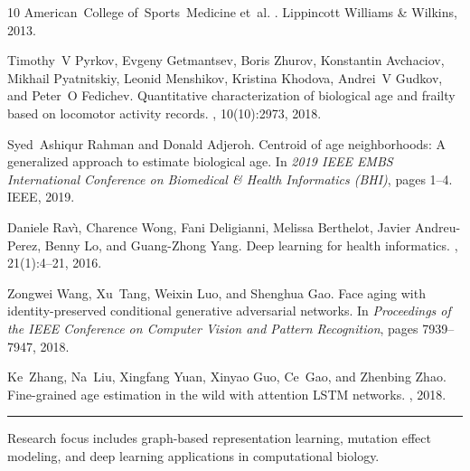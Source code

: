 \documentclass[unnumsec,webpdf,contemporary,large]{oup-authoring-template}%
\theoremstyle{thmstyleone}%
\theoremstyle{thmstyletwo}%
\theoremstyle{thmstylethree}%
\begin{document}
\begin{thebibliography}{10}
American~College of~Sports~Medicine et~al.
.
\newblock Lippincott Williams \& Wilkins, 2013.

Timothy~V Pyrkov, Evgeny Getmantsev, Boris Zhurov, Konstantin Avchaciov, Mikhail Pyatnitskiy, Leonid Menshikov, Kristina Khodova, Andrei~V Gudkov, and Peter~O Fedichev.
\newblock Quantitative characterization of biological age and frailty based on locomotor activity records.
, 10(10):2973, 2018.

Syed~Ashiqur Rahman and Donald Adjeroh.
\newblock Centroid of age neighborhoods: A generalized approach to estimate biological age.
\newblock In {\em 2019 IEEE EMBS International Conference on Biomedical \& Health Informatics (BHI)}, pages 1--4. IEEE, 2019.

Daniele Rav{\`\i}, Charence Wong, Fani Deligianni, Melissa Berthelot, Javier Andreu-Perez, Benny Lo, and Guang-Zhong Yang.
\newblock Deep learning for health informatics.
, 21(1):4--21, 2016.

Zongwei Wang, Xu~Tang, Weixin Luo, and Shenghua Gao.
\newblock Face aging with identity-preserved conditional generative adversarial networks.
\newblock In {\em Proceedings of the IEEE Conference on Computer Vision and Pattern Recognition}, pages 7939--7947, 2018.

Ke~Zhang, Na~Liu, Xingfang Yuan, Xinyao Guo, Ce~Gao, and Zhenbing Zhao.
\newblock Fine-grained age estimation in the wild with attention {LSTM} networks.
, 2018.

\end{thebibliography}

%
%

%
%

\begin{biography}{{\color{black!20}\rule{77pt}{57pt}}}{\author{Author 1.} Research focus includes graph-based representation learning, mutation effect modeling, and deep learning applications in computational biology.}
\end{biography}
\end{document}

